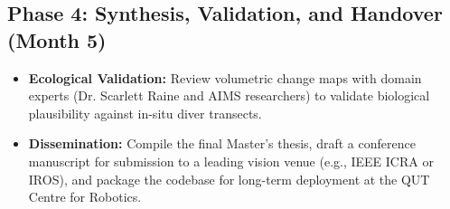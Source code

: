 \subsection{Phase 4: Synthesis, Validation, and Handover (Month 5)}
\begin{itemize}
    \item \textbf{Ecological Validation:} Review volumetric change maps with domain experts (Dr. Scarlett Raine and AIMS researchers) to validate biological plausibility against in-situ diver transects.
    \item \textbf{Dissemination:} Compile the final Master's thesis, draft a conference manuscript for submission to a leading vision venue (e.g., IEEE ICRA or IROS), and package the codebase for long-term deployment at the QUT Centre for Robotics.
\end{itemize}
